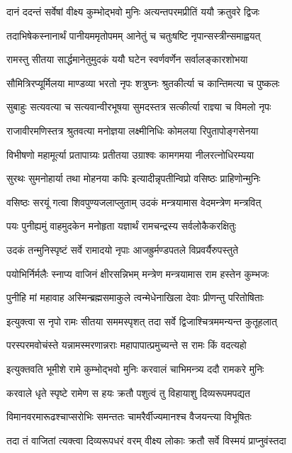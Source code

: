 \twolineshloka
{दानं ददन्तं सर्वेषां वीक्ष्य कुम्भोद्भवो मुनिः}
{अत्यन्तपरमप्रीतिं ययौ क्रतुवरे द्विजः}%

\twolineshloka
{तदाभिषेकस्नानार्थं पानीयममृतोपमम्}
{आनेतुं च चतुःषष्टि नृपान्सस्त्रीन्समाह्वयत्}%

\twolineshloka
{रामस्तु सीतया सार्द्धमानेतुमुदकं ययौ}
{घटेन स्वर्णवर्णेन सर्वालङ्कारशोभया}%

\twolineshloka
{सौमित्रिरप्यूर्मिलया माण्डव्या भरतो नृपः}
{शत्रुघ्नः श्रुतकीर्त्या च कान्तिमत्या च पुष्कलः}%

\twolineshloka
{सुबाहुः सत्यवत्या च सत्यवान्वीरभूषया}
{सुमदस्तत्र सत्कीर्त्या राज्ञ्या च विमलो नृपः}%

\twolineshloka
{राजावीरमणिस्तत्र श्रुतवत्या मनोज्ञया}
{लक्ष्मीनिधिः कोमलया रिपुतापोङ्गसेनया}%

\twolineshloka
{विभीषणो महामूर्त्या प्रतापाग्र्यः प्रतीतया}
{उग्राश्वः कामगमया नीलरत्नोधिरम्यया}%

\twolineshloka
{सुरथः सुमनोहार्या तथा मोहनया कपिः}
{इत्यादीन्नृपतीन्विप्रो वसिष्ठः प्राहिणोन्मुनिः}%

\twolineshloka
{वसिष्ठः सरयूं गत्वा शिवपुण्यजलाप्लुताम्}
{उदकं मन्त्रयामास वेदमन्त्रेण मन्त्रवित्}%

\twolineshloka
{पयः पुनीह्यमुं वाहमुदकेन मनोहृता}
{यज्ञार्थं रामचन्द्रस्य सर्वलोकैकरक्षितुः}%

\twolineshloka
{उदकं तन्मुनिस्पृष्टं सर्वे रामादयो नृपाः}
{आजह्रुर्मण्डपतले विप्रवर्यैरुपस्तुते}%

\twolineshloka
{पयोभिर्निर्मलैः स्नाप्य वाजिनं क्षीरसन्निभम्}
{मन्त्रेण मन्त्रयामास राम हस्तेन कुम्भजः}%

\twolineshloka
{पुनीहि मां महावाह अस्मिन्ब्रह्मसमाकुले}
{त्वन्मेधेनाखिला देवाः प्रीणन्तु परितोषिताः}%

\twolineshloka
{इत्युक्त्वा स नृपो रामः सीतया सममस्पृशत्}
{तदा सर्वे द्विजाश्चित्रममन्यन्त कुतूहलात्}%

\twolineshloka
{परस्परमवोचंस्ते यन्नामस्मरणान्नराः}
{महापापात्प्रमुच्यन्ते स रामः किं वदत्यहो}%

\twolineshloka
{इत्युक्तवति भूमीशे रामे कुम्भोद्भवो मुनिः}
{करवालं चाभिमन्त्र्य ददौ रामकरे मुनिः}%

\twolineshloka
{करवाले धृते स्पृष्टे रामेण स हयः क्रतौ}
{पशुत्वं तु विहायाशु दिव्यरूपमपद्यत}%

\twolineshloka
{विमानवरमारूढश्चाप्सरोभिः समन्ततः}
{चामरैर्वीज्यमानश्च वैजयन्त्या विभूषितः}%

\twolineshloka
{तदा तं वाजितां त्यक्त्वा दिव्यरूपधरं वरम्}
{वीक्ष्य लोकाः क्रतौ सर्वे विस्मयं प्राप्नुवंस्तदा}%

